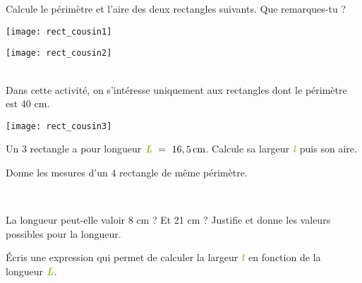
\begin{activite}

\begin{partie}
Calcule le périmètre et l'aire des deux rectangles suivants. Que remarques-tu ?

\begin{minipage}[c]{0.48\linewidth}
 \begin{center} \texttt{[image: rect\_cousin1]} \end{center}
 \end{minipage} \hfill%
 \begin{minipage}[c]{0.48\linewidth}
 \begin{center} \texttt{[image: rect\_cousin2]} \end{center}
  \end{minipage}\\[0.5em]
Dans cette activité, on s'intéresse uniquement aux rectangles dont le périmètre est 40 cm.
\end{partie}


\begin{minipage}[c]{0.28\linewidth}
 \texttt{[image: rect\_cousin3]}
 \end{minipage} \hfill%
 \begin{minipage}[c]{0.64\linewidth}
\vspace{1em}
\begin{partie}
Un 3 rectangle a pour longueur $\emph{\textbf{\textcolor{H1}{L}}} = 16,5\,\text{cm}$. Calcule sa largeur $\emph{\textbf{\textcolor{H1}{l}}}$ puis son aire.
\end{partie}

\begin{partie}
Donne les mesures d'un 4 rectangle de même périmètre.
\end{partie}
  \end{minipage} \\

\begin{partie}
La longueur peut-elle valoir 8 cm ? Et 21 cm ? Justifie et donne les valeurs possibles pour la longueur.
\end{partie}

\begin{partie}
Écris une expression qui permet de calculer la largeur $\emph{\textbf{\textcolor{H1}{l}}}$ en fonction de la longueur $\emph{\textbf{\textcolor{H1}{L}}}$.
\end{partie}


\end{activite}
